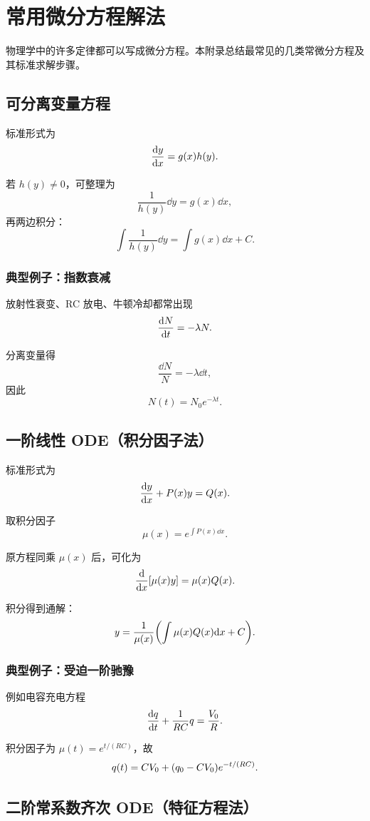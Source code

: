 \chapter{常用微分方程解法}

物理学中的许多定律都可以写成微分方程。本附录总结最常见的几类常微分方程及其标准求解步骤。

\section{可分离变量方程}

标准形式为
\[
\dv{y}{x}=g(x)h(y).
\]

若 $h(y)\neq 0$，可整理为
\[
\frac{1}{h(y)}\dd y=g(x)\dd x,
\]
再两边积分：
\[
\int \frac{1}{h(y)}\dd y=\int g(x)\dd x+C.
\]

\subsection*{典型例子：指数衰减}

放射性衰变、RC 放电、牛顿冷却都常出现
\[
\dv{N}{t}=-\lambda N.
\]

分离变量得
\[
\frac{\dd N}{N}=-\lambda\dd t,
\]
因此
\[
N(t)=N_0 e^{-\lambda t}.
\]

\section{一阶线性 ODE（积分因子法）}

标准形式为
\[
\dv{y}{x}+P(x)y=Q(x).
\]

取积分因子
\[
\mu(x)=e^{\int P(x)\dd x}.
\]

原方程同乘 $\mu(x)$ 后，可化为
\[
\dv{}{x}\qty[\mu(x)y]=\mu(x)Q(x).
\]

积分得到通解：
\[
 y=\frac{1}{\mu(x)}\qty(\int \mu(x)Q(x)\dd x+C).
\]

\subsection*{典型例子：受迫一阶驰豫}

例如电容充电方程
\[
\dv{q}{t}+\frac{1}{RC}q=\frac{V_0}{R}.
\]

积分因子为 $\mu(t)=e^{t/(RC)}$，故
\[
q(t)=CV_0+\qty(q_0-CV_0)e^{-t/(RC)}.
\]

\section{二阶常系数齐次 ODE（特征方程法）}

